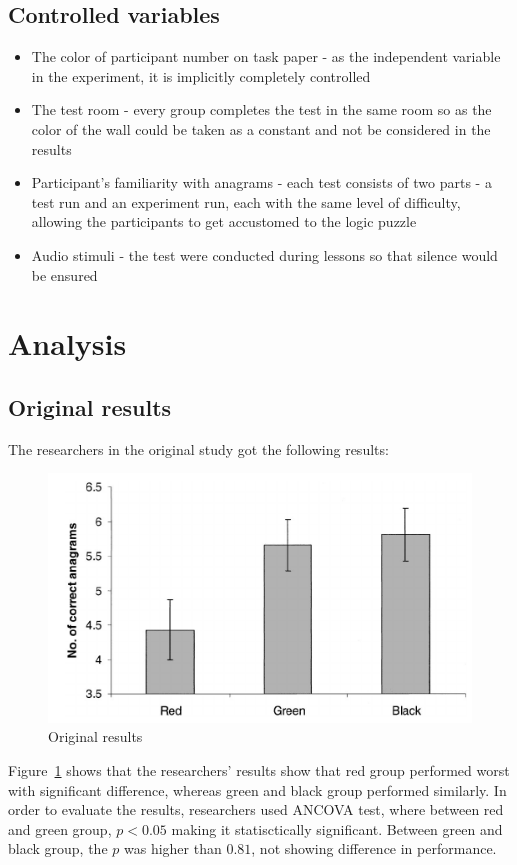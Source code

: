 \documentclass[12pt, a4]{article}
\begin{document}
\subsection*{Controlled variables}
\begin{itemize}
    \item The color of participant number on task paper - as the independent variable in the experiment, it is implicitly completely controlled
    \item The test room - every group completes the test in the same room so as the color of the wall could be taken as a constant and not be considered in the results
    \item Participant's familiarity with anagrams - each test consists of two parts - a test run and an experiment run, each with the same level of difficulty, allowing the 
        participants to get accustomed to the logic puzzle
    \item Audio stimuli - the test were conducted during lessons so that silence would be ensured 
\end{itemize}

\section*{Analysis}
\subsection*{Original results}
The researchers in the original study got the following results:
\begin{figure}[H]
    \centering
    \caption{Original results}
    \label{fig:original}
    \includegraphics{original}
\end{figure}
Figure~\ref{fig:original} shows that the researchers' results show that red group performed worst with significant difference, whereas green and black group performed similarly.
In order to evaluate the results, researchers used ANCOVA test, where between red and green group, $p < 0.05$ making it statisctically significant. Between green and black group, the
$p$ was higher than $0.81$, not showing difference in performance.
\end{document}
